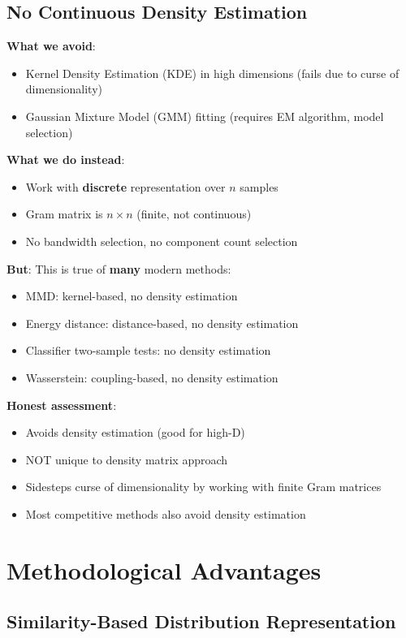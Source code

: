 \documentclass[11pt]{article}
\newcommand{\cmark}{✓}
\newcommand{\xmark}{✗}
\begin{document}
\subsection{No Continuous Density Estimation}

\textbf{What we avoid}:
\begin{itemize}
\item Kernel Density Estimation (KDE) in high dimensions (fails due to curse of dimensionality)
\item Gaussian Mixture Model (GMM) fitting (requires EM algorithm, model selection)
\end{itemize}

\textbf{What we do instead}:
\begin{itemize}
\item Work with \textbf{discrete} representation over $n$ samples
\item Gram matrix is $n \times n$ (finite, not continuous)
\item No bandwidth selection, no component count selection
\end{itemize}

\textbf{But}: This is true of \textbf{many} modern methods:
\begin{itemize}
\item MMD: kernel-based, no density estimation
\item Energy distance: distance-based, no density estimation
\item Classifier two-sample tests: no density estimation
\item Wasserstein: coupling-based, no density estimation
\end{itemize}

\textbf{Honest assessment}:
\begin{itemize}
\item[\cmark] Avoids density estimation (good for high-D)
\item[\xmark] NOT unique to density matrix approach
\item[\cmark] Sidesteps curse of dimensionality by working with finite Gram matrices
\item Most competitive methods also avoid density estimation
\end{itemize}

\section{Methodological Advantages}

\subsection{Similarity-Based Distribution Representation}
\end{document}
